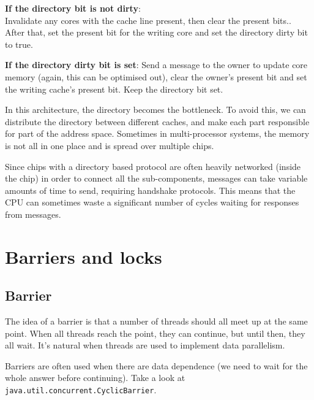 \begin{description}
\begin{itemize}
      \begin{description}
        \item \textbf{If the directory bit is not dirty}:\\
          Invalidate any cores with the cache line present, then clear the
          present bits.. After that, set the present bit for the writing core
          and set the directory dirty bit to true.
        \item \textbf{If the directory dirty bit is set}:
          Send a message to the owner to update core memory (again, this can
          be optimised out), clear the owner's present bit and set the
          writing cache's present bit. Keep the directory bit set.
      \end{description}
    \end{itemize}
\end{description}

In this architecture, the directory becomes the bottleneck. To avoid this, we
can distribute the directory between different caches, and make each part
responsible for part of the address space. Sometimes in multi-processor systems,
the memory is not all in one place and is spread over multiple chips.

Since chips with a directory based protocol are often heavily networked (inside
the chip) in order to connect all the sub-components, messages can take variable
amounts of time to send, requiring handshake protocols. This means that the CPU
can sometimes waste a significant number of cycles waiting for responses from
messages.


\section{Barriers and locks}

\subsection{Barrier}

The idea of a barrier is that a number of threads should all meet up at the same
point. When all threads reach the point, they can continue, but until then, they
all wait. It's natural when threads are used to implement data parallelism.

Barriers are often used when there are data dependence (we need to wait for the
whole answer before continuing). Take a look at
\texttt{java.util.concurrent.CyclicBarrier}.

